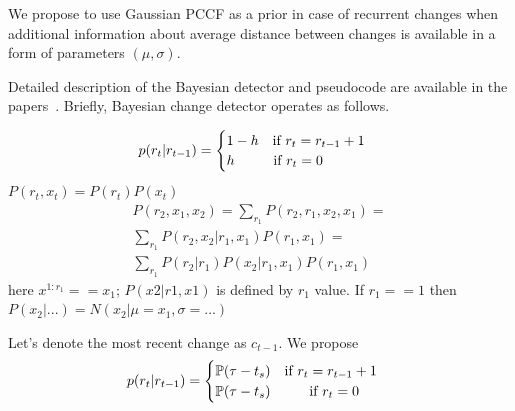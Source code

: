We propose to use Gaussian PCCF as a prior in case of recurrent changes when additional information about average distance between changes is available in a form of parameters $(\mu, \sigma)$.

Detailed description of the \online Bayesian detector and pseudocode are available in the papers~\cite{mackay2007, Wilson2010a}.
Briefly, \online Bayesian change detector operates as follows.

\begin{equation}
p(r_t | r_{t-1}) =
\begin{cases}
1 - h \text{\:\:\: if }  r_t = r_{t-1} + 1 \\
h \text{\:\:\:\:\:\:\:\:\:\:\:  if } r_t = 0
\end{cases}
\label{eq:hazard_rate}
\end{equation}
$P(r_t, x_t) = P(r_t) P(x_t)$
\begin{multline}
P(r_2, x_1, x_2) = \sum_{r_1} P(r_2, r_1, x_2, x_1) = \\
\sum_{r_1} P(r_2, x_2 | r_1, x_1) P(r_1, x_1) = \\
\sum_{r_1} P(r_2 | r_1) P(x_2 | r_1, x_1) P(r_1, x_1)
\end{multline}
here $x^{1:r_1} == x_1$; $P(x2 | r1, x1)$ is defined by $r_1$ value. 
If $r_1 == 1$ then $P(x_2|...) = N(x_2|\mu=x_1, \sigma=...)$

Let's denote the most recent change as $c_{t-1}$. %
We propose
\begin{equation}
p(r_t | r_{t-1}) =
\begin{cases}
\mathbb{P}(\tau -  t_s) \text{\:\:\: if }  r_t = r_{t-1} + 1 \\
\mathbb{P}(\tau -  t_s) \text{\:\:\:\:\:\:\:\:\:\:\:  if } r_t = 0
\end{cases}
\label{eq:hazard_rate_our}
\end{equation}

